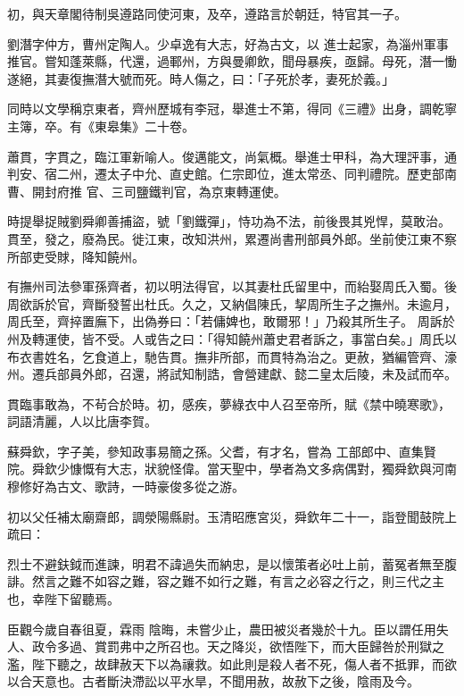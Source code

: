 \begin{pinyinscope}
 初，與天章閣待制吳遵路同使河東，及卒，遵路言於朝廷，特官其一子。



 劉潛字仲方，曹州定陶人。少卓逸有大志，好為古文，以
 進士起家，為淄州軍事推官。嘗知蓬萊縣，代還，過鄆州，方與曼卿飲，聞母暴疾，亟歸。母死，潛一慟遂絕，其妻復撫潛大號而死。時人傷之，曰：「子死於孝，妻死於義。」



 同時以文學稱京東者，齊州歷城有李冠，舉進士不第，得同《三禮》出身，調乾寧主簿，卒。有《東皋集》二十卷。



 蕭貫，字貫之，臨江軍新喻人。俊邁能文，尚氣概。舉進士甲科，為大理評事，通判安、宿二州，遷太子中允、直史館。仁宗即位，進太常丞、同判禮院。歷吏部南曹、開封府推
 官、三司鹽鐵判官，為京東轉運使。



 時提舉捉賊劉舜卿善捕盜，號「劉鐵彈」，恃功為不法，前後畏其兇悍，莫敢治。貫至，發之，廢為民。徙江東，改知洪州，累遷尚書刑部員外郎。坐前使江東不察所部吏受賕，降知饒州。



 有撫州司法參軍孫齊者，初以明法得官，以其妻杜氏留里中，而紿娶周氏入蜀。後周欲訴於官，齊斷發誓出杜氏。久之，又納倡陳氏，挈周所生子之撫州。未逾月，周氏至，齊捽置廡下，出偽券曰：「若傭婢也，敢爾邪！」乃殺其所生子。
 周訴於州及轉運使，皆不受。人或告之曰：「得知饒州蕭史君者訴之，事當白矣。」周氏以布衣書姓名，乞食道上，馳告貫。撫非所部，而貫特為治之。更赦，猶編管齊、濠州。遷兵部員外郎，召還，將試知制誥，會營建獻、懿二皇太后陵，未及試而卒。



 貫臨事敢為，不茍合於時。初，感疾，夢綠衣中人召至帝所，賦《禁中曉寒歌》，詞語清麗，人以比唐李賀。



 蘇舜欽，字子美，參知政事易簡之孫。父耆，有才名，嘗為
 工部郎中、直集賢院。舜欽少慷慨有大志，狀貌怪偉。當天聖中，學者為文多病偶對，獨舜欽與河南穆修好為古文、歌詩，一時豪俊多從之游。



 初以父任補太廟齋郎，調滎陽縣尉。玉清昭應宮災，舜欽年二十一，詣登聞鼓院上疏曰：



 烈士不避鈇鉞而進諫，明君不諱過失而納忠，是以懷策者必吐上前，蓄冤者無至腹誹。然言之難不如容之難，容之難不如行之難，有言之必容之行之，則三代之主也，幸陛下留聽焉。



 臣觀今歲自春徂夏，霖雨
 陰晦，未嘗少止，農田被災者幾於十九。臣以謂任用失人、政令多過、賞罰弗中之所召也。天之降災，欲悟陛下，而大臣歸咎於刑獄之濫，陛下聽之，故肆赦天下以為禳救。如此則是殺人者不死，傷人者不抵罪，而欲以合天意也。古者斷決滯訟以平水旱，不聞用赦，故赦下之後，陰雨及今。




\end{pinyinscope}
